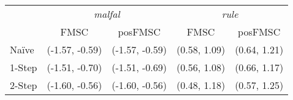 \begin{tabular}{lcccc} 
 \hline \hline 
 & \multicolumn{2}{c}{\emph{malfal}} & \multicolumn{2}{c}{\emph{rule}}\\ 
 & FMSC & posFMSC & FMSC & posFMSC\\ 
 \hline 
Na\"{i}ve & (-1.57, -0.59) & (-1.57, -0.59) & (0.58, 1.09) & (0.64, 1.21) \\ 
 1-Step & (-1.51, -0.70) & (-1.51, -0.69) & (0.56, 1.08) & (0.66, 1.17) \\ 
 2-Step & (-1.60, -0.56) & (-1.60, -0.56) & (0.48, 1.18) & (0.57, 1.25)\\ 
 \hline 
\end{tabular}
